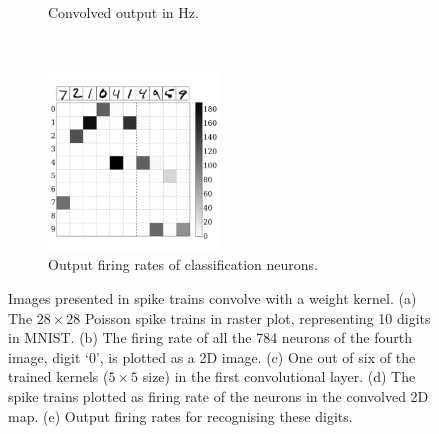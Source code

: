 \begin{figure}[htbp!]
\begin{subfigure}[t]{0.3\textwidth}
			\caption{Convolved output in Hz.}
			\label{Fig:64}
		\end{subfigure}\\
		\begin{subfigure}[t]{\textwidth}
			\centering
			\includegraphics[width=0.5\textwidth]{pics_iconip/7.pdf}
			\caption{Output firing rates of classification neurons.}
		\end{subfigure}
		\caption[Images presented in spike trains convolve with a weight kernel.]{Images presented in spike trains convolve with a weight kernel. (a) The $28\times28$ Poisson spike trains in raster plot, representing 10 digits in MNIST. (b) The firing rate of all the 784 neurons of the fourth image, digit `0', is plotted as a 2D image.
		(c) One out of six of the trained kernels ($5\times5$ size) in the first convolutional layer.
		(d) The spike trains plotted as firing rate of the neurons in the convolved 2D map.
		(e) Output firing rates for recognising these digits.}
		\label{fig:cnn}
	\end{figure}

